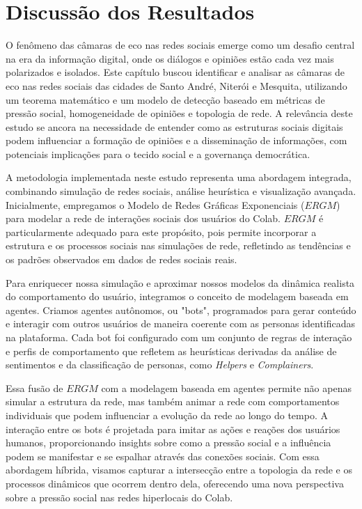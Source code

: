 \section{Discussão dos Resultados}

O fenômeno das câmaras de eco nas redes sociais emerge como um desafio central na era da informação digital, onde os diálogos e opiniões estão cada vez mais polarizados e isolados. Este capítulo buscou identificar e analisar as câmaras de eco nas redes sociais das cidades de Santo André, Niterói e Mesquita, utilizando um teorema matemático e um modelo de detecção baseado em métricas de pressão social, homogeneidade de opiniões e topologia de rede. A relevância deste estudo se ancora na necessidade de entender como as estruturas sociais digitais podem influenciar a formação de opiniões e a disseminação de informações, com potenciais implicações para o tecido social e a governança democrática.

A metodologia implementada neste estudo representa uma abordagem integrada, combinando simulação de redes sociais, análise heurística e visualização avançada. Inicialmente, empregamos o Modelo de Redes Gráficas Exponenciais ($ERGM$) para modelar a rede de interações sociais dos usuários do Colab. $ERGM$ é particularmente adequado para este propósito, pois permite incorporar a estrutura e os processos sociais nas simulações de rede, refletindo as tendências e os padrões observados em dados de redes sociais reais.

Para enriquecer nossa simulação e aproximar nossos modelos da dinâmica realista do comportamento do usuário, integramos o conceito de modelagem baseada em agentes. Criamos agentes autônomos, ou "bots", programados para gerar conteúdo e interagir com outros usuários de maneira coerente com as personas identificadas na plataforma. Cada bot foi configurado com um conjunto de regras de interação e perfis de comportamento que refletem as heurísticas derivadas da análise de sentimentos e da classificação de personas, como \textit{Helpers} e \textit{Complainers}.

Essa fusão de $ERGM$ com a modelagem baseada em agentes permite não apenas simular a estrutura da rede, mas também animar a rede com comportamentos individuais que podem influenciar a evolução da rede ao longo do tempo. A interação entre os bots é projetada para imitar as ações e reações dos usuários humanos, proporcionando insights sobre como a pressão social e a influência podem se manifestar e se espalhar através das conexões sociais. Com essa abordagem híbrida, visamos capturar a intersecção entre a topologia da rede e os processos dinâmicos que ocorrem dentro dela, oferecendo uma nova perspectiva sobre a pressão social nas redes hiperlocais do Colab.

